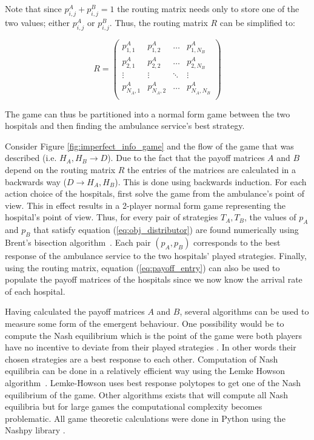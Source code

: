 Note that since \(p_{i,j}^A + p_{i,j}^B = 1\) the routing matrix needs only to
store one of the two values; either \(p_{i,j}^A\) or \(p_{i,j}^B\).
Thus, the routing matrix \(R\) can be simplified to:

\begin{equation}\label{eq:routing_matrix_simplified}
    R = 
    \begin{pmatrix}
        p_{1,1}^A & p_{1,2}^A & \dots & p_{1,N_B}^A \\
        p_{2,1}^A & p_{2,2}^A & \dots & p_{2,N_B}^A \\
        \vdots & \vdots & \ddots & \vdots \\
        p_{N_A,1}^A & p_{N_A,2}^A & \dots & p_{N_A,N_B}^A \\
    \end{pmatrix}
\end{equation}

The game can thus be partitioned into a normal form game between the
two hospitals and then finding the ambulance service's best strategy. 

Consider Figure \ref{fig:imperfect_info_game} and the flow of the game that was
described (i.e. \(H_A, H_B \rightarrow D\)).
Due to the fact that the payoff matrices \(A\) and \(B\) depend on the routing 
matrix \(R\) the entries of the matrices are calculated in a backwards way 
(\(D \rightarrow H_A, H_B\)). 
This is done using backwards induction. 
For each action choice of the hospitals, first solve the game from the
ambulance's point of view.
This in effect results in a 2-player normal form game representing the
hospital's point of view.
Thus, for every pair of strategies \(T_A, T_B\), the values of \(p_A\) and 
\(p_B\) that satisfy equation (\ref{eq:obj_distributor}) are found
numerically using Brent's bisection algorithm~\cite{brent1973algorithms}.
Each pair \((p_A, p_B)\) corresponds to the best response of the ambulance
service to the two hospitals' played strategies.
Finally, using the routing matrix, equation (\ref{eq:payoff_entry}) can also be
used to populate the payoff matrices of the hospitals since we now know the 
arrival rate of each hospital.

Having calculated the payoff matrices \(A\) and \(B\), several algorithms can 
be used to measure some form of the emergent behaviour.
One possibility would be to compute the Nash equilibrium
which is the point of the game were both players have no 
incentive to deviate from their played strategies \cite{kreps1989nash}.
In other words their chosen strategies are a best response to each other.
Computation of Nash equilibria can be done in a relatively efficient way using 
the Lemke Howson algorithm~\cite{LemkeHowson}.
Lemke-Howson uses best response polytopes to get one of the Nash equilibrium of
the game. 
Other algorithms exists that will compute all Nash equilibria but 
for large games the computational complexity becomes problematic.
All game theoretic calculations were done in Python using the Nashpy library 
\cite{thenashpyproject}.

